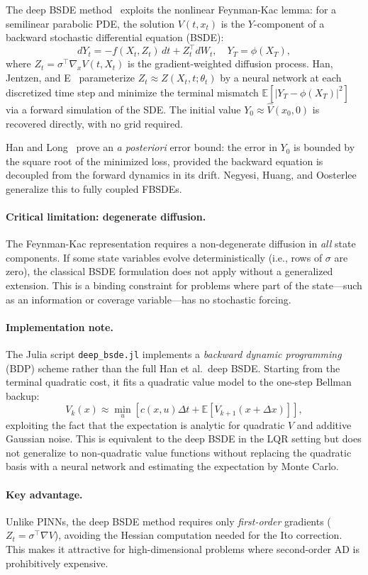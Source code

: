 The deep BSDE method~\cite{han2018solving} exploits the nonlinear Feynman-Kac
lemma: for a semilinear parabolic PDE, the solution $V(t,x_t)$ is the
$Y$-component of a backward stochastic differential equation (BSDE):
\begin{equation}
  dY_t = -f(X_t,Z_t)\,dt + Z_t^\top dW_t,\quad Y_T=\phi(X_T),
\end{equation}
where $Z_t=\sigma^\top\nabla_x V(t,X_t)$ is the gradient-weighted
diffusion process.  Han, Jentzen, and E~\cite{han2018solving} parameterize
$Z_t\approx\hat Z(X_t,t;\theta_t)$ by a neural network at each discretized
time step and minimize the terminal mismatch
$\mathbb{E}[|Y_T-\phi(X_T)|^2]$ via a forward simulation of the SDE.
The initial value $Y_0\approx\hat V(x_0,0)$ is recovered directly,
with no grid required.

Han and Long~\cite{han2020convergence} prove an \emph{a posteriori} error
bound: the error in $Y_0$ is bounded by the square root of the minimized
loss, provided the backward equation is decoupled from the forward
dynamics in its drift.
Negyesi, Huang, and Oosterlee~\cite{negyesi2024coupled} generalize this
to fully coupled FBSDEs.

\paragraph{Critical limitation: degenerate diffusion.}
The Feynman-Kac representation requires a non-degenerate diffusion in
\emph{all} state components.  If some state variables evolve
deterministically (i.e., rows of $\sigma$ are zero), the classical BSDE
formulation does not apply without a generalized extension.
This is a binding constraint for problems where part of the state---such
as an information or coverage variable---has no stochastic forcing.

\paragraph{Implementation note.}
The Julia script \texttt{deep\_bsde.jl} implements a
\emph{backward dynamic programming} (BDP) scheme rather than the full
Han et al.\ deep BSDE.  Starting from the terminal quadratic cost, it
fits a quadratic value model to the one-step Bellman backup:
\begin{equation}
  V_k(x) \approx \min_u\!\left[c(x,u)\Delta t
    + \mathbb{E}[V_{k+1}(x+\Delta x)]\right],
\end{equation}
exploiting the fact that the expectation is analytic for quadratic $V$
and additive Gaussian noise.  This is equivalent to the deep BSDE in the
LQR setting but does not generalize to non-quadratic value functions
without replacing the quadratic basis with a neural network and estimating
the expectation by Monte Carlo.

\paragraph{Key advantage.}
Unlike PINNs, the deep BSDE method requires only \emph{first-order}
gradients ($Z_t=\sigma^\top\nabla V$), avoiding the Hessian computation
needed for the Ito correction.  This makes it attractive for high-dimensional
problems where second-order AD is prohibitively expensive.
